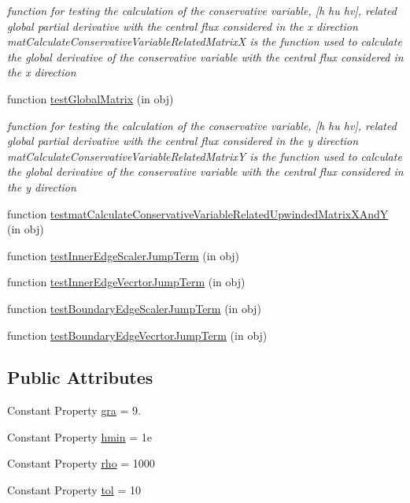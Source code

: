 \begin{DoxyCompactItemize}
\begin{DoxyCompactList}\small\item\em function for testing the calculation of the conservative variable, \mbox{[}h hu hv\mbox{]}, related global partial derivative with the central flux considered in the x direction mat\+Calculate\+Conservative\+Variable\+Related\+MatrixX is the function used to calculate the global derivative of the conservative variable with the central flux considered in the x direction \end{DoxyCompactList}\item 
function \hyperlink{class_ndg_nonhydrostatic_abstract_test_a9b81c2b1cd173ba4765c0cac5061eed7}{test\+Global\+Matrix} (in obj)
\begin{DoxyCompactList}\small\item\em function for testing the calculation of the conservative variable, \mbox{[}h hu hv\mbox{]}, related global partial derivative with the central flux considered in the y direction mat\+Calculate\+Conservative\+Variable\+Related\+MatrixY is the function used to calculate the global derivative of the conservative variable with the central flux considered in the y direction \end{DoxyCompactList}\item 
function \hyperlink{class_ndg_nonhydrostatic_abstract_test_af2121228e1bbe04aff2baa0f212ce9be}{testmat\+Calculate\+Conservative\+Variable\+Related\+Upwinded\+Matrix\+X\+AndY} (in obj)
\item 
function \hyperlink{class_ndg_nonhydrostatic_abstract_test_ae2876d5306cb72a76c2c68aafdfa33f0}{test\+Inner\+Edge\+Scaler\+Jump\+Term} (in obj)
\item 
function \hyperlink{class_ndg_nonhydrostatic_abstract_test_aea8e1b571cf026ff45fa77de52efe15c}{test\+Inner\+Edge\+Vecrtor\+Jump\+Term} (in obj)
\item 
function \hyperlink{class_ndg_nonhydrostatic_abstract_test_a67af2a99186b16ca53a36609b682aa85}{test\+Boundary\+Edge\+Scaler\+Jump\+Term} (in obj)
\item 
function \hyperlink{class_ndg_nonhydrostatic_abstract_test_a24fce962e2b161b7fae0c93148ea765a}{test\+Boundary\+Edge\+Vecrtor\+Jump\+Term} (in obj)
\end{DoxyCompactItemize}
\subsection*{Public Attributes}
\begin{DoxyCompactItemize}
\item 
Constant Property \hyperlink{class_ndg_nonhydrostatic_abstract_test_a93c380296a5041ae0c40aaab83f9a412}{gra} = 9.
\item 
Constant Property \hyperlink{class_ndg_nonhydrostatic_abstract_test_a1fe286c21310d6e066fb3ebd6030a212}{hmin} = 1e
\item 
Constant Property \hyperlink{class_ndg_nonhydrostatic_abstract_test_a56cc33e2601e720147400387ba4df15b}{rho} = 1000
\item 
Constant Property \hyperlink{class_ndg_nonhydrostatic_abstract_test_a3859c87e1ad5683b16464201f2c5c129}{tol} = 10
\end{DoxyCompactItemize}
